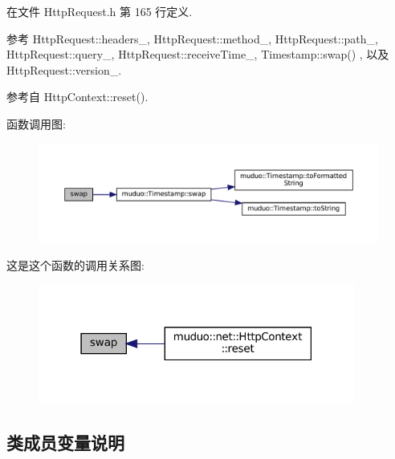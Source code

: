 在文件 Http\+Request.\+h 第 165 行定义.



参考 Http\+Request\+::headers\+\_\+, Http\+Request\+::method\+\_\+, Http\+Request\+::path\+\_\+, Http\+Request\+::query\+\_\+, Http\+Request\+::receive\+Time\+\_\+, Timestamp\+::swap() , 以及 Http\+Request\+::version\+\_\+.



参考自 Http\+Context\+::reset().

函数调用图\+:
\nopagebreak
\begin{figure}[H]
\begin{center}
\leavevmode
\includegraphics[width=350pt]{classmuduo_1_1net_1_1HttpRequest_a175188d59044234c59dcec6513a685b4_cgraph}
\end{center}
\end{figure}
这是这个函数的调用关系图\+:
\nopagebreak
\begin{figure}[H]
\begin{center}
\leavevmode
\includegraphics[width=295pt]{classmuduo_1_1net_1_1HttpRequest_a175188d59044234c59dcec6513a685b4_icgraph}
\end{center}
\end{figure}


\subsection{类成员变量说明}
\mbox{\label{classmuduo_1_1net_1_1HttpRequest_a5399fcc713a2d468facbbcc1e84999cf}} 
